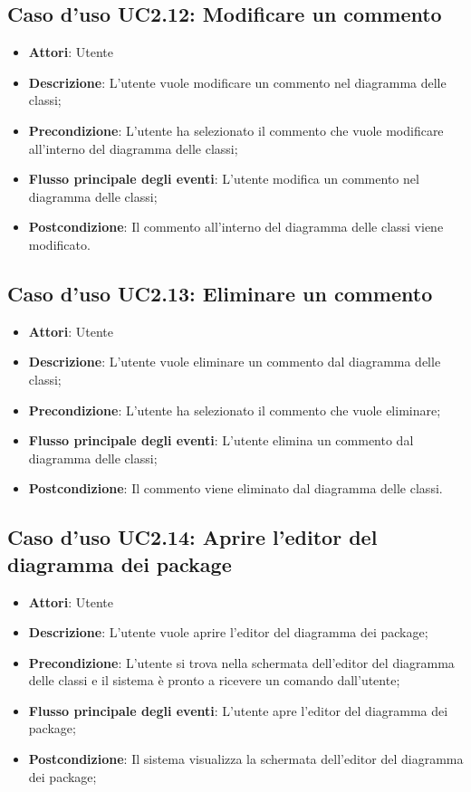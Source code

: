 \documentclass[../AnalisiDeiRequisiti.tex]{subfiles}
\begin{document}
		\subsection{Caso d'uso UC2.12: Modificare un commento}
		\begin{itemize}
			\item \textbf{Attori}: Utente
			\item \textbf{Descrizione}: L'utente vuole modificare un commento nel diagramma delle classi;
			\item \textbf{Precondizione}: L'utente ha selezionato il commento che vuole modificare all'interno del diagramma delle classi;
			\item \textbf{Flusso principale degli eventi}: L'utente modifica un commento nel diagramma delle classi;
			\item \textbf{Postcondizione}: Il commento all'interno del diagramma delle classi viene modificato.
		\end{itemize}
		\subsection{Caso d'uso UC2.13: Eliminare un commento}
		\begin{itemize}
			\item \textbf{Attori}: Utente
			\item \textbf{Descrizione}: L'utente vuole eliminare un commento dal diagramma delle classi;
			\item \textbf{Precondizione}: L'utente ha selezionato il commento che vuole eliminare;
			\item \textbf{Flusso principale degli eventi}: L'utente elimina un commento dal diagramma delle classi;
			\item \textbf{Postcondizione}: Il commento viene eliminato dal diagramma delle classi.
		\end{itemize}
		\subsection{Caso d'uso UC2.14: Aprire l'editor del diagramma dei package}
		\begin{itemize}
			\item \textbf{Attori}: Utente
			\item \textbf{Descrizione}: L'utente vuole aprire l'editor del diagramma dei package;
			\item \textbf{Precondizione}: L'utente si trova nella schermata dell'editor del diagramma delle classi e il sistema è pronto a ricevere un comando dall'utente;
			\item \textbf{Flusso principale degli eventi}: L'utente apre l'editor del diagramma dei package;
			\item \textbf{Postcondizione}: Il sistema visualizza la schermata dell'editor del diagramma dei package;
		\end{itemize}
\end{document}
